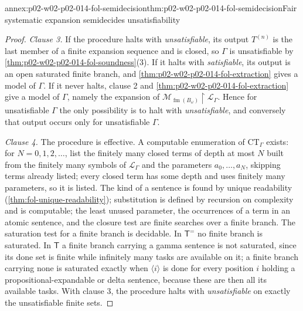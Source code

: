\begin{annexitem}{annex:p02-w02-p02-014-fol-semidecision}{thm:p02-w02-p02-014-fol-semidecision}{Fair systematic expansion semidecides unsatisfiability}
\begin{proof}
\emph{Clause 3.}  If the procedure halts with \emph{unsatisfiable}, its output
\(T^{(n)}\) is the last member of a finite expansion sequence and is closed,
so \(\Gamma\) is unsatisfiable by \cref{thm:p02-w02-p02-014-fol-soundness}(3).
If it halts with \emph{satisfiable}, its output is an open saturated finite
branch, and \cref{thm:p02-w02-p02-014-fol-extraction} gives a model of
\(\Gamma\).  If it never halts, clause 2 and
\cref{thm:p02-w02-p02-014-fol-extraction} give a model of \(\Gamma\), namely
the expansion of \(\mathcal M_{\operatorname{fm}(B_\omega)}\restriction\mathcal
L_{\Gamma}\).  Hence for unsatisfiable \(\Gamma\) the only possibility is to
halt with \emph{unsatisfiable}, and conversely that output occurs only for
unsatisfiable \(\Gamma\).

\emph{Clause 4.}  The procedure is effective.  A computable enumeration of
\(\mathrm{CT}_{\Gamma}\) exists: for \(N=0,1,2,\ldots\), list the finitely
many closed terms of depth at most \(N\) built from the finitely many symbols
of \(\mathcal L_{\Gamma}\) and the parameters \(a_0,\ldots,a_N\), skipping
terms already listed; every closed term has some depth and uses finitely many
parameters, so it is listed.  The kind of a sentence is found by unique
readability (\cref{thm:fol-unique-readability}); substitution is defined by
recursion on complexity and is computable; the least unused parameter, the
occurrences of a term in an atomic sentence, and the closure test are finite
searches over a finite branch.  The saturation test for a finite branch is
decidable.  In \(\mathsf T^{=}\) no finite branch is saturated.  In
\(\mathsf T\) a finite branch carrying a gamma sentence is not saturated,
since its done set is finite while infinitely many tasks are available on
it; a finite branch carrying none is saturated exactly when
\(\langle i\rangle\) is done for every position \(i\) holding a
propositional-expandable or delta sentence, because these are then all its
available tasks.  With clause 3, the procedure halts with
\emph{unsatisfiable} on exactly the unsatisfiable finite sets.
\end{proof}
\end{annexitem}

